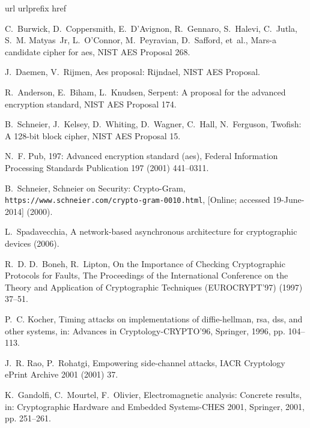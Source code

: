 \documentclass[3p]{elsarticle}
\begin{document}
%
\begin{thebibliography}{10}
\expandafter\ifx\csname url\endcsname\relax
  \def\url#1{\texttt{#1}}\fi
\expandafter\ifx\csname urlprefix\endcsname\relax\def\urlprefix{URL }\fi
\expandafter\ifx\csname href\endcsname\relax
  \def\href#1#2{#2} \def\path#1{#1}\fi

C.~Burwick, D.~Coppersmith, E.~D’Avignon, R.~Gennaro, S.~Halevi, C.~Jutla,
  S.~M. Matyas~Jr, L.~O’Connor, M.~Peyravian, D.~Safford, et~al., Mars-a
  candidate cipher for aes, NIST AES Proposal 268.

J.~Daemen, V.~Rijmen, Aes proposal: Rijndael, NIST AES Proposal.

R.~Anderson, E.~Biham, L.~Knudsen, Serpent: A proposal for the advanced
  encryption standard, NIST AES Proposal 174.

B.~Schneier, J.~Kelsey, D.~Whiting, D.~Wagner, C.~Hall, N.~Ferguson, Twofish: A
  128-bit block cipher, NIST AES Proposal 15.

N.~F. Pub, 197: Advanced encryption standard (aes), Federal Information
  Processing Standards Publication 197 (2001) 441--0311.

B.~Schneier, {Schneier on Security: Crypto-Gram},
  \url{https://www.schneier.com/crypto-gram-0010.html}, [Online; accessed
  19-June-2014] (2000).

L.~Spadavecchia, A network-based asynchronous architecture for cryptographic
  devices (2006).

R.~D. D.~Boneh, R.~Lipton, {On the Importance of Checking Cryptographic
  Protocols for Faults}, The Proceedings of the International Conference on the
  Theory and Application of Cryptographic Techniques (EUROCRYPT'97) (1997)
  37--51.

P.~C. Kocher, Timing attacks on implementations of diffie-hellman, rsa, dss,
  and other systems, in: Advances in Cryptology-CRYPTO'96, Springer, 1996, pp.
  104--113.

J.~R. Rao, P.~Rohatgi, Empowering side-channel attacks, IACR Cryptology ePrint
  Archive 2001 (2001) 37.

K.~Gandolfi, C.~Mourtel, F.~Olivier, Electromagnetic analysis: Concrete
  results, in: Cryptographic Hardware and Embedded Systems-CHES 2001, Springer,
  2001, pp. 251--261.


\end{thebibliography}
\end{document}
